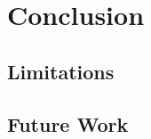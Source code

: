 \documentclass[cic,tc,english]{iiufrgs}
\begin{document}
\chapter{Conclusion}

\section{Limitations}

\section{Future Work}





\end{document}
